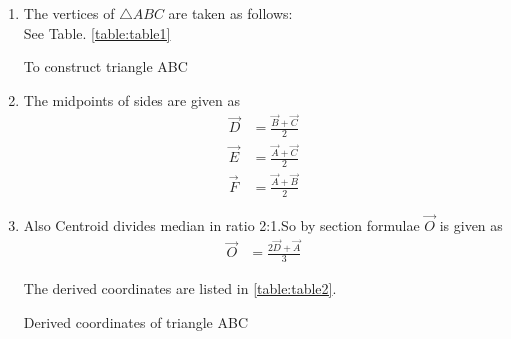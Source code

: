 \renewcommand{\theequation}{\theenumi}
\begin{enumerate}[label=\thesection.\arabic*.,ref=\thesection.\theenumi]

\item The vertices of $\triangle ABC$ are taken as follows:
\label{const:table1}
\\
\solution See Table. \ref{table:table1} 
%
\begin{table}[ht!]
\centering

\caption{To construct triangle ABC}
\label{table:table1}	
\end{table}


\item The midpoints of sides are given as
\begin{align}
\vec{D} &= \frac{\vec{B}+\vec{C}}{2}
\label{eq:pointd}
\\
\vec{E} &= \frac{\vec{A}+\vec{C}}{2}
\\
\vec{F} &= \frac{\vec{A}+\vec{B}}{2}
\end{align}
\item Also Centroid divides median in ratio 2:1.So by section formulae $\vec{O}$ is given as
\begin{align}
\vec{O} &= \frac{2\vec{D}+\vec{A}}{3}
\label{eq:centr}
\end{align}

The derived coordinates are listed in \ref{table:table2}. 
%
\begin{table}[ht!]
\centering

\caption{Derived coordinates of triangle ABC}
\label{table:table2}	
\end{table}

\end{enumerate}
